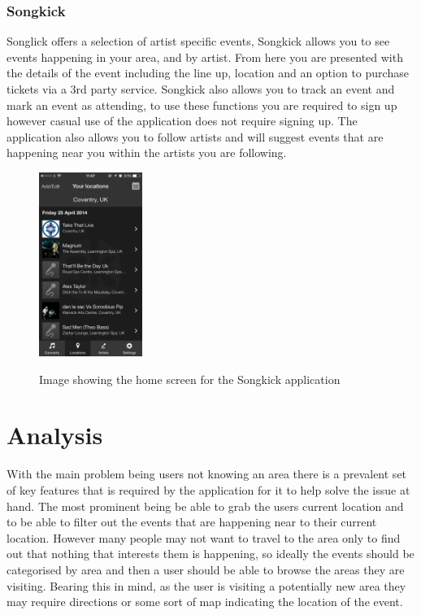 		\subsubsection{Songkick}
			Songlick\cite{songkick} offers a selection of artist specific events, Songkick allows you to see events happening in your area, and by artist. From here you are presented with the details of the event including the line up, location and an option to purchase tickets via a 3rd party service. Songkick also allows you to track an event and mark an event as attending, to use these functions you are required to sign up however casual use of the application does not require signing up. The application also allows you to follow artists and will suggest events that are happening near you within the artists you are following.
			\begin{figure}[H] %
				\caption[Songkick home screen]{Image showing the home screen for the Songkick application }
				\centering
				\includegraphics[width=0.3\textwidth]{Images/songkick}
				\label{fig:songkick}
			\end{figure}

\section{Analysis}

	With the main problem being users not knowing an area there is a prevalent set of key features that is required by the application for it to help solve the issue at hand. The most prominent being be able to grab the users current location and to be able to filter out the events that are happening near to their current location. However many people may not want to travel to the area only to find out that nothing that interests them is happening, so ideally the events should be categorised by area and then a user should be able to browse the areas they are visiting. Bearing this in mind, as the user is visiting a potentially new area they may require directions or some sort of map indicating the location of the event. 

